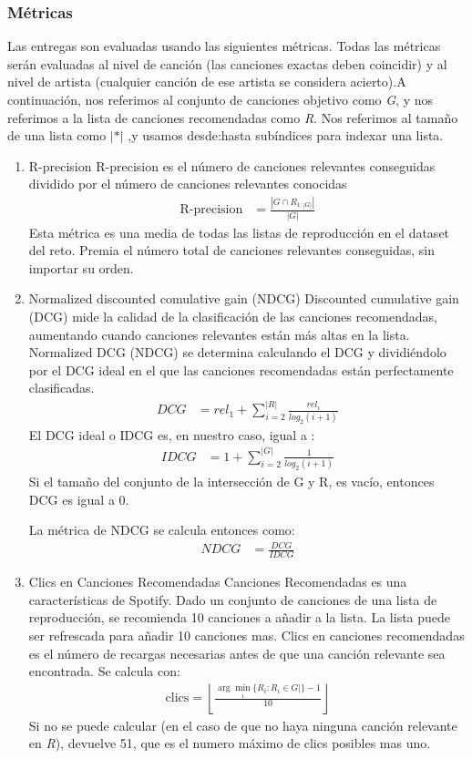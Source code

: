 \documentclass{article}
\begin{document}
	\subsubsection{Métricas}
	Las entregas son evaluadas usando las siguientes métricas. Todas las métricas serán evaluadas al nivel de canción (las canciones exactas deben coincidir) y al nivel de artista (cualquier canción de ese artista se considera acierto).A continuación, nos referimos al conjunto de canciones objetivo como \textit{G}, y nos referimos a la lista de canciones recomendadas como \textit{R}. Nos referimos al tamaño de una lista como $| *|$ ,y usamos desde:hasta subíndices para indexar una lista.
	\begin{enumerate}
		\item  R-precision
		R-precision es el número de canciones relevantes conseguidas dividido por el número de canciones relevantes conocidas
		\begin{align*}
		  \text{R-precision} &= \frac{|G \cap R_{1:|G|}|}{|G|}
		\end{align*}
		Esta métrica es una media de todas las listas de reproducción en el dataset del reto. Premia el número total de canciones relevantes conseguidas, sin importar su orden.
		\item Normalized discounted comulative gain (NDCG)
		Discounted cumulative gain (DCG) mide la calidad de la clasificación de las canciones recomendadas, aumentando cuando canciones relevantes están más altas en la lista. Normalized DCG  (NDCG) se determina calculando el DCG y dividiéndolo por el DCG ideal en el que las canciones recomendadas están perfectamente clasificadas. 
		\begin{align*}
		  DCG &= rel_{1}+\sum_{i=2}^{|R|}\frac{rel_{i}}{log_{2}(i+1)}
		\end{align*}
		El DCG ideal o IDCG es, en nuestro caso, igual a :
		\begin{align*}
		  IDCG &= 1+\sum_{i=2}^{|G|}\frac{1}{log_{2}(i+1)}
		\end{align*}
		Si el tamaño del conjunto de la intersección de G y R, es vacío, entonces DCG es igual a 0.
 
		La métrica de NDCG se calcula entonces como:
		\begin{align*}
		  NDCG &= \frac{DCG}{IDCG}
		\end{align*}

		\item Clics en Canciones Recomendadas
		Canciones Recomendadas es una características de Spotify. Dado un conjunto de canciones de una lista de reproducción, se recomienda 10 canciones a añadir a la lista. La lista puede ser refrescada para añadir 10 canciones mas. Clics en canciones recomendadas es el número de recargas necesarias antes de que una canción relevante sea encontrada. Se calcula con:
		\begin{align*}
		 \text{clics} = \left\lfloor \frac{ \arg\min_i \{ R_i\colon R_i \in G|\} - 1}{10} \right\rfloor
		\end{align*}
		Si no se puede calcular (en el caso de que no haya ninguna canción relevante en \textit{R}), devuelve 51, que es el numero máximo de clics posibles mas uno.
	\end{enumerate}
\end{document}
